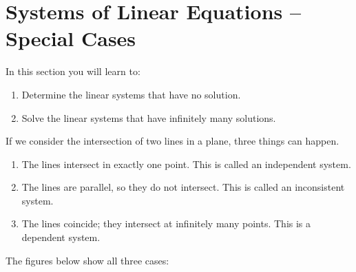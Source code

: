 \section{Systems of Linear Equations – Special Cases}
In this section you will learn to:
\begin{enumerate}
    \item Determine the linear systems that have no solution.
    \item Solve the linear systems that have infinitely many solutions.
\end{enumerate}
If we consider the intersection of two lines in a plane, three things can happen.
\begin{enumerate}
    \item The lines intersect in exactly one point. This is called an independent system.
    \item The lines are parallel, so they do not intersect. This is called an inconsistent system.
    \item The lines coincide; they intersect at infinitely many points. This is a dependent system.
\end{enumerate}
The figures below show all three cases:

\begin{minipage}{0.32\textwidth}
\end{minipage}%
\begin{minipage}{0.32\textwidth}
\end{minipage}%
\begin{minipage}{0.32\textwidth}
\end{minipage}


